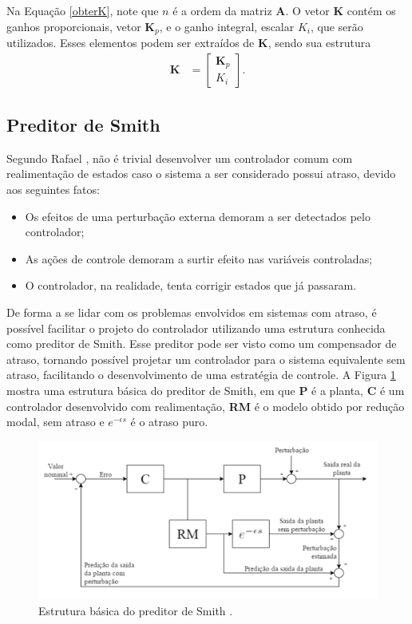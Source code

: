 Na Equação \ref{obterK}, note que $n$ é a ordem da matriz $\mathbf{A}$. O vetor $\mathbf{K}$ contém os ganhos proporcionais, vetor $\mathbf{K}_p$, e o ganho integral, escalar $K_i$, que serão utilizados. Esses elementos podem ser extraídos de $\mathbf{K}$, sendo sua estrutura \begin{align}
	\mathbf{K} & = \left[\begin{array}{c}\mathbf{K}_p\\ K_i\end{array}\right].
\end{align}

\subsection{Preditor de Smith}

Segundo Rafael \cite{rafaelMestrado}, não é trivial desenvolver um controlador comum com
realimentação de estados caso o sistema a ser considerado possui atraso, devido aos seguintes fatos:
\begin{itemize}
\item Os efeitos de uma perturbação externa demoram a ser detectados pelo controlador;
\item As ações de controle demoram a surtir efeito nas variáveis controladas;
\item O controlador, na realidade, tenta corrigir estados que já passaram.
\end{itemize}

De forma a se lidar com os problemas envolvidos em sistemas com atraso, é possível facilitar o projeto do controlador utilizando uma estrutura conhecida como preditor de Smith. Esse preditor pode ser visto como um compensador de atraso, tornando possível projetar um controlador para o sistema equivalente sem atraso, facilitando o desenvolvimento de uma estratégia de controle. A Figura \ref{smith1} mostra uma estrutura básica do preditor de Smith, em que \textbf{P} é a planta, \textbf{C} é um controlador desenvolvido com realimentação, \textbf{RM} é o modelo obtido por redução modal, sem atraso e $e^{-\epsilon s}$ é o atraso puro.

\begin{figure}[!ht]
\centering
\caption{Estrutura básica do preditor de Smith \cite{rafaelMestrado}. \label{smith1}}
\includegraphics[width=.85\linewidth]{figs/fundamentos/preditorSmithSemKalman}
\end{figure}

